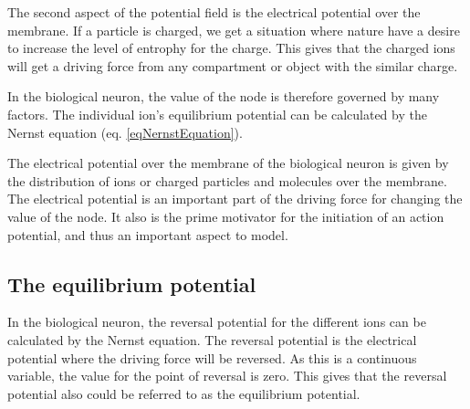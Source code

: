 The second aspect of the potential field is the electrical potential over the membrane. 
If a particle is charged, we get a situation where nature have a desire to increase the level of entrophy for the charge.
This gives that the charged ions will get a driving force from any compartment or object with the similar charge.


In the biological neuron, the value of the node is therefore governed by many factors. 
The individual ion's equilibrium potential can be calculated by the Nernst equation (eq. \ref{eqNernstEquation}).


The electrical potential over the membrane of the biological neuron is given by the distribution of ions or charged particles and molecules over the  membrane.
The electrical potential is an important part of the driving force for changing the value of the node.
It also is the prime motivator for the initiation of an action potential, and thus an important aspect to model.





\subsection{The equilibrium potential}
\label{ssecTheEquilibriumPotential}
In the biological neuron, the reversal potential for the different ions can be calculated by the Nernst equation. 
The reversal potential is the electrical potential where the driving force will be reversed.
As this is a continuous variable, the value for the point of reversal is zero. 
This gives that the reversal potential also could be referred to as the equilibrium potential.


